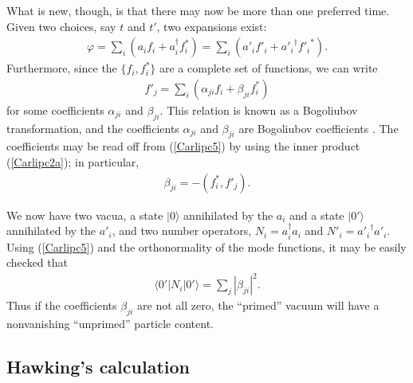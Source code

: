 \documentclass[12pt]{article}
\begin{document}
What is new, though, is that there may now be more than one preferred time.
Given two choices, say $t$ and $t'$, two expansions exist:
\begin{align}
\varphi = \sum_i \left(a_if_i + a_i^\dagger f_i^*\right)  
  = \sum_i\left(a'_if'_i + {a'_i}^\dagger {f'_i}^*\right)   .
\label{Carlipc4}
\end{align}
Furthermore, since the $\{f_i,f_i^*\}$ are a complete set of functions, we can
write
\begin{align}
f'_j 
  = \sum_i \left(\alpha_{ji}f_i + \beta_{ji}f_i^*\right) 
\label{Carlipc5}
\end{align}
for some coefficients $\alpha_{ji}$ and $\beta_{ji}$.
This relation is known as a Bogoliubov transformation, and 
the coefficients $\alpha_{ji}$ and $\beta_{ji}$ are Bogoliubov 
coefficients \cite{Bogoliubov}.   The coefficients may be
read off from (\ref{Carlipc5}) by using the inner product (\ref{Carlipc2a});
in particular,
\begin{align}
\beta_{ji} = -(f^*_i,f'_j)  .
\label{Carlipc5a}
\end{align}

We now have two vacua, a state $|0\rangle$ annihilated by the 
$a_i$ and a state $|0'\rangle$ annihilated by the $a'_i$, and
two number operators, $N_i=a_i^\dagger a_i$ 
and $N'_i={a'_i}^\dagger a'_i$.  Using (\ref{Carlipc5}) and the 
orthonormality of the mode functions, it may be easily checked that
\begin{align}
\langle 0'| N_i |0'\rangle = \sum_j |\beta_{ji}|^2 .
\label{Carlipc6}
\end{align}
Thus if the coefficients $\beta_{ji}$ are not all zero, the 
``primed'' vacuum will have a nonvanishing ``unprimed'' particle 
content.

\subsection{Hawking's calculation \label{Hawka}}
\end{document}
